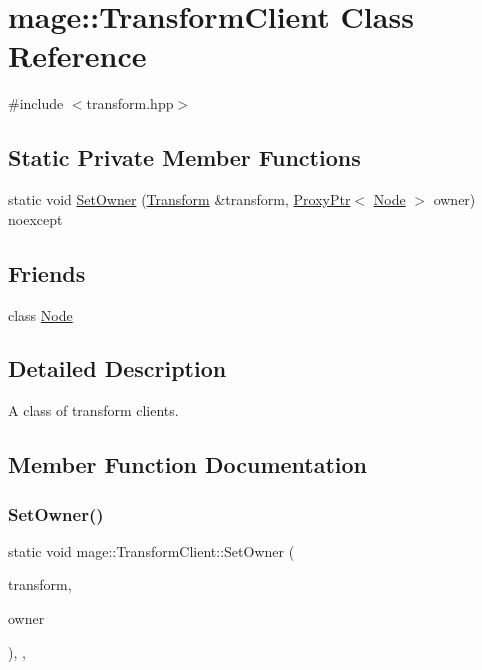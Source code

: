 \hypertarget{classmage_1_1_transform_client}{}\section{mage\+:\+:Transform\+Client Class Reference}
\label{classmage_1_1_transform_client}


{\ttfamily \#include $<$transform.\+hpp$>$}

\subsection*{Static Private Member Functions}
\begin{DoxyCompactItemize}
\item 
static void \mbox{\hyperlink{classmage_1_1_transform_client_a2aa5a5d9d95b161f6673409cc11e1e1c}{Set\+Owner}} (\mbox{\hyperlink{classmage_1_1_transform}{Transform}} \&transform, \mbox{\hyperlink{classmage_1_1_proxy_ptr}{Proxy\+Ptr}}$<$ \mbox{\hyperlink{classmage_1_1_node}{Node}} $>$ owner) noexcept
\end{DoxyCompactItemize}
\subsection*{Friends}
\begin{DoxyCompactItemize}
\item 
class \mbox{\hyperlink{classmage_1_1_transform_client_a6db9d28bd448a131448276ee03de1e6d}{Node}}
\end{DoxyCompactItemize}


\subsection{Detailed Description}
A class of transform clients. 

\subsection{Member Function Documentation}
\mbox{\label{classmage_1_1_transform_client_a2aa5a5d9d95b161f6673409cc11e1e1c}} 
\subsubsection{\texorpdfstring{Set\+Owner()}{SetOwner()}}
{\footnotesize\ttfamily static void mage\+::\+Transform\+Client\+::\+Set\+Owner (\begin{DoxyParamCaption}\item[{\mbox{\hyperlink{classmage_1_1_transform}{Transform}} \&}]{transform,  }\item[{\mbox{\hyperlink{classmage_1_1_proxy_ptr}{Proxy\+Ptr}}$<$ \mbox{\hyperlink{classmage_1_1_node}{Node}} $>$}]{owner }\end{DoxyParamCaption})\hspace{0.3cm}{\ttfamily [static]}, {\ttfamily [private]}, {\ttfamily [noexcept]}}

